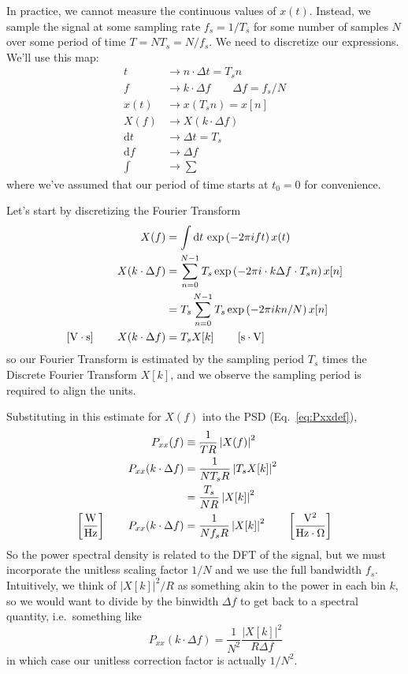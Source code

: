 \documentclass{article}
\newcommand{\dd}[1]{\mathrm{d}#1\,}
\begin{document}
In practice, we cannot measure the continuous values of \(x(t)\). Instead, we sample
the signal at some sampling rate \(f_s = 1/T_s\) for some number of samples \(N\) over some
period of time \(T = NT_s=N/f_s\). We need to discretize our expressions. We'll use
this map:
%
\begin{align*}
    t & \to n\cdot \Delta t = T_s n \\
    f & \to k \cdot \Delta f \qquad \Delta f = f_s/N \\
    x(t) & \to x(T_s n) = x[n] \\
    X(f) & \to X(k\cdot \Delta f) \\
    \dd{t} & \to \Delta t = T_s \\
    \dd{f} & \to \Delta f \\
    \int & \to \sum
\end{align*}
%
where we've assumed that our period of time starts at \(t_0 = 0\) for convenience. 

Let's start by discretizing the Fourier Transform
%
\begin{align}
    X(f) & = \int \dd{t} \exp\left(-2\pi i f t\right) x(t) \notag \\
    X(k\cdot \Delta f) & = \sum_{n=0}^{N-1} T_s \exp\left(-2\pi i \cdot k\Delta f \cdot T_s n\right) x[n] \notag \\
    & = T_s \sum_{n=0}^{N-1} T_s \exp\left(-2\pi i kn/N\right) x[n] \notag \\
    \left[\mathrm{V\cdot s}\right]\qquad X(k\cdot \Delta f) & = T_s X[k] \qquad \left[\mathrm{s\cdot V}\right]\label{eq:XktoXf}
\end{align}
%
so our Fourier Transform is estimated by the sampling period \(T_s\) times the 
Discrete Fourier Transform \(X[k]\), and we observe the sampling period is required
to align the units. 

Substituting in this estimate for \(X(f)\) into the PSD (Eq.~\eqref{eq:Pxxdef}),
%
\begin{align}
    P_{xx}(f) & \equiv \frac{1}{TR} \left|X(f)\right|^2 \notag \\
    P_{xx}(k\cdot \Delta f) & = \frac{1}{N T_s R} \left|T_s X[k]\right|^2 \notag \\
    & = \frac{T_s}{N R} \left|X[k]\right|^2 \notag \\
    \left[\mathrm{\frac{W}{Hz}}\right] \qquad P_{xx}(k\cdot \Delta f) & = \frac{1}{N f_s R} \left|X[k]\right|^2 \qquad \left[\mathrm{\frac{V^2}{Hz\cdot \Omega}}\right] \label{eq:Pxxkdf}
\end{align}
%
So the power spectral density is related to the DFT of the signal, but we must
incorporate the unitless scaling factor \(1/N\) and we use the full bandwidth
\(f_s\). Intuitively, we think of \(\left|X[k]\right|^2/R\) as something akin to 
the power in each bin \(k\), so we would want to divide by the binwidth \(\Delta f\)
to get back to a spectral quantity, i.e.~something like
%
\begin{equation}
    \qquad P_{xx}(k\cdot \Delta f) = \frac{1}{N^2} \frac{\left|X[k]\right|^2}{R\Delta f}
\end{equation}
%
in which case our unitless correction factor is actually \(1/N^2\).
\end{document}
